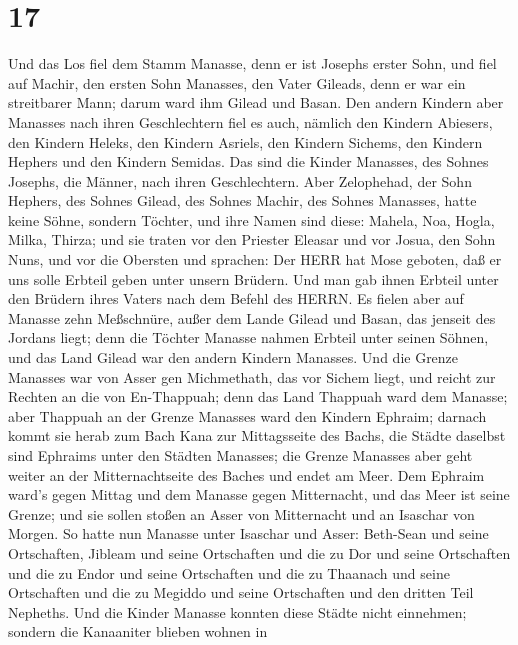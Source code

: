 \hypertarget{section-16}{%
\section{17}\label{section-16}}

 Und das Los fiel dem Stamm Manasse, denn er ist Josephs
erster Sohn, und fiel auf Machir, den ersten Sohn Manasses, den Vater
Gileads, denn er war ein streitbarer Mann; darum ward ihm Gilead und
Basan.  Den andern Kindern aber Manasses nach ihren
Geschlechtern fiel es auch, nämlich den Kindern Abiesers, den Kindern
Heleks, den Kindern Asriels, den Kindern Sichems, den Kindern Hephers
und den Kindern Semidas. Das sind die Kinder Manasses, des Sohnes
Josephs, die Männer, nach ihren Geschlechtern.  Aber
Zelophehad, der Sohn Hephers, des Sohnes Gilead, des Sohnes Machir, des
Sohnes Manasses, hatte keine Söhne, sondern Töchter, und ihre Namen sind
diese: Mahela, Noa, Hogla, Milka, Thirza;  und sie traten
vor den Priester Eleasar und vor Josua, den Sohn Nuns, und vor die
Obersten und sprachen: Der HERR hat Mose geboten, daß er uns solle
Erbteil geben unter unsern Brüdern. Und man gab ihnen Erbteil unter den
Brüdern ihres Vaters nach dem Befehl des HERRN.  Es fielen
aber auf Manasse zehn Meßschnüre, außer dem Lande Gilead und Basan, das
jenseit des Jordans liegt;  denn die Töchter Manasse nahmen
Erbteil unter seinen Söhnen, und das Land Gilead war den andern Kindern
Manasses.  Und die Grenze Manasses war von Asser gen
Michmethath, das vor Sichem liegt, und reicht zur Rechten an die von
En-Thappuah;  denn das Land Thappuah ward dem Manasse; aber
Thappuah an der Grenze Manasses ward den Kindern Ephraim; 
darnach kommt sie herab zum Bach Kana zur Mittagsseite des Bachs, die
Städte daselbst sind Ephraims unter den Städten Manasses; die Grenze
Manasses aber geht weiter an der Mitternachtseite des Baches und endet
am Meer.  Dem Ephraim ward's gegen Mittag und dem Manasse
gegen Mitternacht, und das Meer ist seine Grenze; und sie sollen stoßen
an Asser von Mitternacht und an Isaschar von Morgen.  So
hatte nun Manasse unter Isaschar und Asser: Beth-Sean und seine
Ortschaften, Jibleam und seine Ortschaften und die zu Dor und seine
Ortschaften und die zu Endor und seine Ortschaften und die zu Thaanach
und seine Ortschaften und die zu Megiddo und seine Ortschaften und den
dritten Teil Nepheths.  Und die Kinder Manasse konnten
diese Städte nicht einnehmen; sondern die Kanaaniter blieben wohnen in
